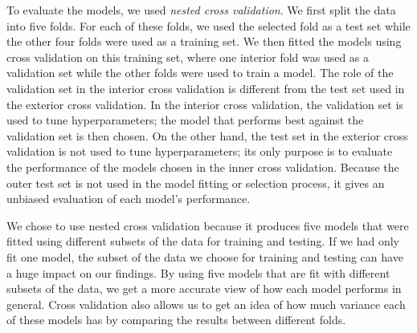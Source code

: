 \documentclass{article}
\begin{document}
	
	To evaluate the models, we used \textit{nested cross validation}. We first split the data into five folds. For each of these folds, we used the selected fold as a test set while the other four folds were used as a training set. We then fitted the models using cross validation on this training set, where one interior fold was used as a validation set while the other folds were used to train a model. The role of the validation set in the interior cross validation is different from the test set used in the exterior cross validation. In the interior cross validation, the validation set is used to tune hyperparameters; the model that performs best against the validation set is then chosen. On the other hand, the test set in the exterior cross validation is not used to tune hyperparameters; its only purpose is to evaluate the performance of the models chosen in the inner cross validation. Because the outer test set is not used in the model fitting or selection process, it gives an unbiased evaluation of each model's performance.
	
	We chose to use nested cross validation because it produces five models that were fitted using different subsets of the data for training and testing. If we had only fit one model, the subset of the data we choose for training and testing can have a huge impact on our findings. By using five models that are fit with different subsets of the data, we get a more accurate view of how each model performs in general. Cross validation also allows us to get an idea of how much variance each of these models has by comparing the results between different folds.
	
\end{document}
